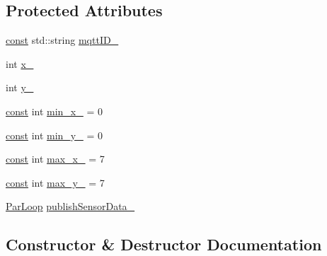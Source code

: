 \subsection*{Protected Attributes}
\begin{DoxyCompactItemize}
\item 
\hyperlink{functions__c_8js_afacfd9c985d225bb07483b887a801b6f}{const} std\+::string \hyperlink{class_m_q_t_tsense_h_a_t_a061227b35a480c89792c4bc44329b1ca}{mqtt\+I\+D\+\_\+}
\item 
int \hyperlink{class_m_q_t_tsense_h_a_t_a767f72e68bff1bf52e07b66f44ac40c8}{x\+\_\+}
\item 
int \hyperlink{class_m_q_t_tsense_h_a_t_a608b724d2ab92ed1ea3b3c4c1066961d}{y\+\_\+}
\item 
\hyperlink{functions__c_8js_afacfd9c985d225bb07483b887a801b6f}{const} int \hyperlink{class_m_q_t_tsense_h_a_t_a6ffe54a927f8c11b396b91049eba7cd0}{min\+\_\+x\+\_\+} = 0
\item 
\hyperlink{functions__c_8js_afacfd9c985d225bb07483b887a801b6f}{const} int \hyperlink{class_m_q_t_tsense_h_a_t_a6e45ba7d68af176081550ac1348e0beb}{min\+\_\+y\+\_\+} = 0
\item 
\hyperlink{functions__c_8js_afacfd9c985d225bb07483b887a801b6f}{const} int \hyperlink{class_m_q_t_tsense_h_a_t_aa232cc9b0473918d82b92c6d9a97377a}{max\+\_\+x\+\_\+} = 7
\item 
\hyperlink{functions__c_8js_afacfd9c985d225bb07483b887a801b6f}{const} int \hyperlink{class_m_q_t_tsense_h_a_t_a2f30b45f01fdb4517ec1b9a047614c67}{max\+\_\+y\+\_\+} = 7
\item 
\hyperlink{class_par_loop}{Par\+Loop} \hyperlink{class_m_q_t_tsense_h_a_t_ab9a43131eb5e89aa2a6e26505c74a47c}{publish\+Sensor\+Data\+\_\+}
\end{DoxyCompactItemize}


\subsection{Constructor \& Destructor Documentation}
